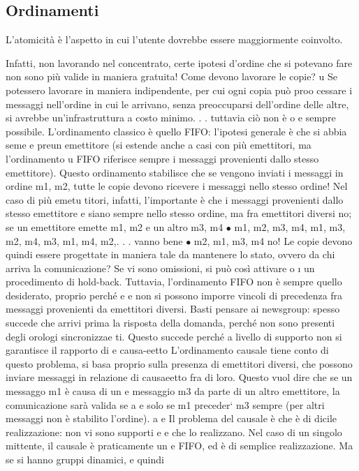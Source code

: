 \subsection{Ordinamenti}
L'atomicità è l'aspetto in cui l'utente dovrebbe essere maggiormente coinvolto.

Infatti, non lavorando nel concentrato, certe ipotesi d'ordine che si potevano
fare non sono più valide in maniera gratuita! Come devono lavorare le copie?
u
Se potessero lavorare in maniera indipendente, per cui ogni copia può proo
cessare i messaggi nell'ordine in cui le arrivano, senza preoccuparsi dell'ordine
delle altre, si avrebbe un'infrastruttura a costo minimo. . . tuttavia ciò non è
o
e
sempre possibile.
L'ordinamento classico è quello FIFO: l'ipotesi generale è che si abbia seme
e
preun emettitore (si estende anche a casi con più emettitori, ma l'ordinamento
u
FIFO riferisce sempre i messaggi provenienti dallo stesso emettitore). Questo
ordinamento stabilisce che se vengono inviati i messaggi in ordine m1, m2, tutte
le copie devono ricevere i messaggi nello stesso ordine! Nel caso di più emetu
titori, infatti, l'importante è che i messaggi provenienti dallo stesso emettitore
e
siano sempre nello stesso ordine, ma fra emettitori diversi no; se un emettitore
emette m1, m2 e un altro m3, m4
$\bullet$ m1, m2, m3, m4, m1, m3, m2, m4, m3, m1, m4, m2,. . . vanno bene
$\bullet$ m2, m1, m3, m4 no!
Le copie devono quindi essere progettate in maniera tale da mantenere lo stato,
ovvero da chi arriva la comunicazione? Se vi sono omissioni, si può così attivare
o
\i{}
un procedimento di hold-back.
Tuttavia, l'ordinamento FIFO non è sempre quello desiderato, proprio perché
e
e
non si possono imporre vincoli di precedenza fra messaggi provenienti da emettitori diversi. Basti pensare ai newsgroup:
spesso succede che arrivi prima
la risposta della domanda, perché non sono presenti degli orologi sincronizzae
ti. Questo succede perché a livello di supporto non si garantisce il rapporto di
e
causa-eetto
L'ordinamento causale tiene conto di questo problema, si basa proprio sulla
presenza di emettitori diversi, che possono inviare messaggi in relazione di causaeetto fra di loro. Questo vuol dire
che se un messaggo m1 è causa di un
e
messaggio m3 da parte di un altro emettitore, la comunicazione sarà valida se
a
e solo se m1 preceder` m3 sempre (per altri messaggi non è stabilito l'ordine).
a
e
Il problema del causale è che è di dicile realizzazione: non vi sono supporti
e
e
che lo realizzano. Nel caso di un singolo mittente, il causale è praticamente un
e
FIFO, ed è di semplice realizzazione. Ma se si hanno gruppi dinamici, e quindi
